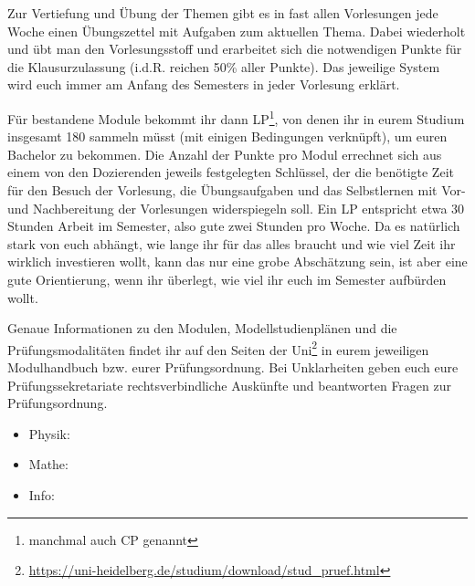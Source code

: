 Zur Vertiefung und Übung der Themen gibt es in fast allen Vorlesungen jede Woche einen Übungszettel mit Aufgaben zum aktuellen Thema. Dabei wiederholt und übt man den Vorlesungsstoff und erarbeitet sich die notwendigen Punkte für die Klausurzulassung (i.d.R. reichen 50\% aller Punkte). Das jeweilige System wird euch immer am Anfang des Semesters in jeder Vorlesung erklärt.

Für bestandene Module bekommt ihr dann \gls{LP}\footnote{manchmal auch \gls{CP} genannt}, von denen ihr in eurem Studium insgesamt 180 sammeln müsst (mit einigen Bedingungen verknüpft), um euren Bachelor zu bekommen. Die Anzahl der Punkte pro Modul errechnet sich aus einem von den Dozierenden jeweils festgelegten Schlüssel, der die benötigte Zeit für den Besuch der Vorlesung, die Übungsaufgaben und das Selbstlernen mit Vor- und Nachbereitung der Vorlesungen widerspiegeln soll. Ein \gls{LP} entspricht etwa 30 Stunden Arbeit im Semester, also gute zwei Stunden pro Woche. Da es natürlich stark von euch abhängt, wie lange ihr für das alles braucht und wie viel Zeit ihr wirklich investieren wollt, kann das nur eine grobe Abschätzung sein, ist aber eine gute Orientierung, wenn ihr überlegt, wie viel ihr euch im Semester aufbürden wollt.

Genaue Informationen zu den Modulen, Modellstudienplänen und die Prüfungsmodalitäten findet ihr auf den Seiten der Uni\footnote{\url{https://uni-heidelberg.de/studium/download/stud_pruef.html}} in eurem jeweiligen Modulhandbuch bzw. eurer Prüfungsordnung. Bei Unklarheiten geben euch eure Prüfungssekretariate rechtsverbindliche Auskünfte und beantworten Fragen zur Prüfungsordnung. 
\begin{itemize}
	\item Physik: \pruefsekphysik
	\item Mathe: \pruefsekmathe
	\item Info: \pruefsekinfo
\end{itemize}
